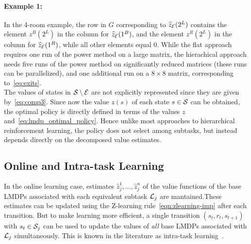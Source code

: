 \paragraph{Example 1:} In the 4-room example, the row in $G$ corresponding to $\widehat{z}_{\mathcal{E}}(2^L)$ contains the element $z^B(2^L)$ in the column for $\widehat{z}_{\mathcal{E}}(1^B)$, and the element $z^R(2^L)$ in the column for $\widehat{z}_{\mathcal{E}}(1^R)$, while all other elements equal $0$. While the flat approach requires one run of the power method on a large matrix, %
the hierachical approach needs five runs of the power method on significantly reduced %
 matrices (these runs can be parallelized), and one additional run on a $8\times 8$ matrix, corresponding to~\eqref{eq:exits}.\\ %

The values of states in $\mathcal{S}\setminus\mathcal{E}$ are not explicitly represented since they are given by~\eqref{eq:comp3}.
Since now the value $z(s)$ of each state $s\in\mathcal{S}$ can be obtained, the optimal policy is directly defined in terms of the values $z$ and~\eqref{eq:lmdp_optimal_policy}. Hence unlike most approaches to hierarchical reinforcement learning, the policy does not select among subtasks, but instead depends directly on the decomposed value estimates.

\subsection{Online and Intra-task Learning}


In the online learning case, estimates $\widehat{z}_j^1,\ldots,\widehat{z}_j^n$ of the value functions of the base LMDPs associated with each equivalent subtask $\mathcal{L}_j$ are mantained.These estimates can be updated using the Z-learning rule~\eqref{eqn:zlearning-imp} after each transition.
But to make learning more efficient, a single transition $(s_t,r_t,s_{t+1})$ with $s_t\in\mathcal{S}_j$ can be used to update the values of {\em all} base LMDPs associated with $\mathcal{L}_j$ simultaneously. This is known in the literature as intra-task learning~\citep{Kaelbling1993,Jonsson2016}.



